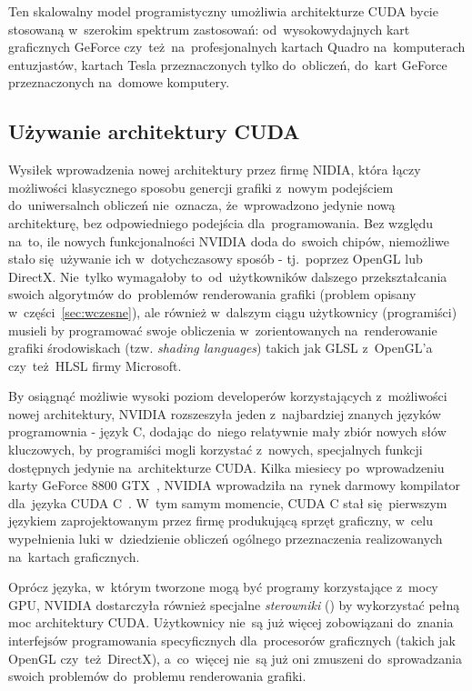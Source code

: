 Ten skalowalny model programistyczny umożliwia architekturze CUDA bycie stosowaną w~szerokim spektrum zastosowań: od~wysokowydajnych kart graficznych GeForce czy~też~na~profesjonalnych kartach Quadro na~komputerach entuzjastów, kartach Tesla przeznaczonych tylko do~obliczeń, do~kart GeForce przeznaczonych na~domowe komputery.

\subsection{Używanie architektury CUDA}

Wysiłek wprowadzenia nowej architektury przez firmę NIDIA, która łączy możliwości klasycznego sposobu genercji grafiki z~nowym podejściem do~uniwersalnch obliczeń nie~oznacza, że~wprowadzono jedynie nową architekturę, bez odpowiedniego podejścia dla~programowania. Bez względu na~to, ile nowych funkcjonalności NVIDIA doda do~swoich chipów, niemożliwe stało się~używanie ich w~dotychczasowy sposób - tj.~poprzez OpenGL lub DirectX. Nie~tylko wymagałoby to~od~użytkowników dalszego przekształcania swoich algorytmów do~problemów renderowania grafiki (problem opisany w~części~\ref{sec:wczesne}), ale również w~dalszym ciągu użytkownicy (programiści) musieli by programować swoje obliczenia w~zorientowanych na~renderowanie grafiki środowiskach (tzw. \emph{shading languages}) takich jak GLSL z~OpenGL'a czy~też~HLSL firmy Microsoft.

By osiągnąć możliwie wysoki poziom developerów korzystających z~możliwości nowej architektury, NVIDIA rozszeszyła jeden z~najbardziej znanych języków programownia - język C, dodając do~niego relatywnie mały zbiór nowych słów kluczowych, by programiści mogli korzystać z~nowych, specjalnych funkcji dostępnych jedynie na~architekturze CUDA. Kilka miesiecy po~wprowadzeniu karty GeForce 8800 GTX~\cite{nvidia:geforce8800}, NVIDIA wprowadziła na~rynek darmowy kompilator dla~języka CUDA C~\cite{cuda:downloads}. W~tym samym momencie, CUDA C stał się~pierwszym językiem zaprojektowanym przez firmę produkującą sprzęt graficzny, w~celu wypełnienia luki w~dziedzienie obliczeń ogólnego przeznaczenia realizowanych na~kartach graficznych.

Oprócz języka, w~którym tworzone mogą być programy korzystające z~mocy GPU, NVIDIA dostarczyła również specjalne \emph{sterowniki} () by wykorzystać pełną moc architektury CUDA. Użytkownicy nie~są już więcej zobowiązani do~znania interfejsów programowania specyficznych dla~procesorów graficznych (takich jak OpenGL czy~też~DirectX), a~co~więcej nie~są już oni zmuszeni do~sprowadzania swoich problemów do~problemu renderowania grafiki.

